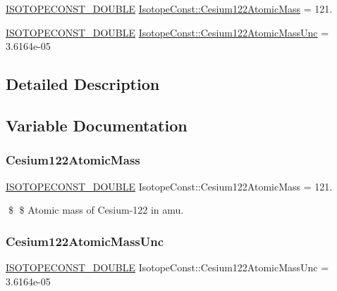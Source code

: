 \begin{DoxyCompactItemize}
\item 
\mbox{\hyperlink{group___isotope_const-_macros_ga8f45a7272ce02c0b4c65c44636ed719a}{I\+S\+O\+T\+O\+P\+E\+C\+O\+N\+S\+T\+\_\+\+D\+O\+U\+B\+LE}} \mbox{\hyperlink{group___isotope_const-_cesium-_cs122_ga2876262f4fe9e4f55e530be263fbd25c}{Isotope\+Const\+::\+Cesium122\+Atomic\+Mass}} = 121.
\item 
\mbox{\hyperlink{group___isotope_const-_macros_ga8f45a7272ce02c0b4c65c44636ed719a}{I\+S\+O\+T\+O\+P\+E\+C\+O\+N\+S\+T\+\_\+\+D\+O\+U\+B\+LE}} \mbox{\hyperlink{group___isotope_const-_cesium-_cs122_gaea458d971d70ef0742b59d474850694a}{Isotope\+Const\+::\+Cesium122\+Atomic\+Mass\+Unc}} = 3.\+6164e-\/05
\end{DoxyCompactItemize}


\subsection{Detailed Description}


\subsection{Variable Documentation}
\mbox{\label{group___isotope_const-_cesium-_cs122_ga2876262f4fe9e4f55e530be263fbd25c}} 
\subsubsection{\texorpdfstring{Cesium122\+Atomic\+Mass}{Cesium122AtomicMass}}
{\footnotesize\ttfamily \mbox{\hyperlink{group___isotope_const-_macros_ga8f45a7272ce02c0b4c65c44636ed719a}{I\+S\+O\+T\+O\+P\+E\+C\+O\+N\+S\+T\+\_\+\+D\+O\+U\+B\+LE}} Isotope\+Const\+::\+Cesium122\+Atomic\+Mass = 121.}

\$ \$ Atomic mass of Cesium-\/122 in amu. \mbox{\label{group___isotope_const-_cesium-_cs122_gaea458d971d70ef0742b59d474850694a}} 
\subsubsection{\texorpdfstring{Cesium122\+Atomic\+Mass\+Unc}{Cesium122AtomicMassUnc}}
{\footnotesize\ttfamily \mbox{\hyperlink{group___isotope_const-_macros_ga8f45a7272ce02c0b4c65c44636ed719a}{I\+S\+O\+T\+O\+P\+E\+C\+O\+N\+S\+T\+\_\+\+D\+O\+U\+B\+LE}} Isotope\+Const\+::\+Cesium122\+Atomic\+Mass\+Unc = 3.\+6164e-\/05}

